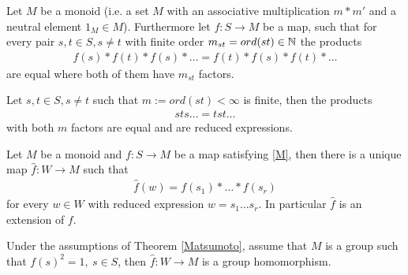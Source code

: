 \documentclass[]{article}
\begin{document}
Let \(M\) be a monoid (i.e. a set \(M\) with an associative multiplication \(m * m'\) and a neutral element \(1_M \in M\)). Furthermore
let \(f:S \rightarrow M\) be a map, such that for every pair \(s,t \in S, s \neq t\) with finite order \(m_{st}=ord(st) \in {\mathbb{N}}\) the products
\begin{align*}
    f(s)*f(t)*f(s)* \dots = f(t) * f(s) * f(t) *\dots \tag{M}
    \label{M}
\end{align*}
are equal where both of them have \(m_{st}\) factors. 
\setcounter{theorem}{7}

\begin{remark}
    Let \(s,t \in S, s \neq t\) such that \(m:=ord(st)< \infty\) is finite, then the products
    \begin{align*}
        sts \dots = tst \dots
    \end{align*}
    with both \(m\) factors are equal and are reduced expressions. 
    \label{remark:commutativity of products}
\end{remark}

\begin{theorem}[Matsumoto 1960's]
    Let \(M\) be a monoid and \(f:S \rightarrow M\) be a map satisfying \eqref{M}, then there is a unique map 
    \(\hat{f}:W \rightarrow M\) such that
    \begin{align*}
        \hat{f}(w)=f(s_1) * \dots * f(s_r)
    \end{align*}
    for every \(w \in W\) with reduced expression \(w=s_1 \dots s_r\). In particular \(\hat{f}\) is an extension of \(f\).
    \label{Matsumoto}
\end{theorem}

\begin{corollary}
    Under the assumptions of Theorem \ref{Matsumoto}, assume that \(M\) is a group such that \(f(s)^2=1, \ s \in S\), 
    then \(\hat{f}:W \rightarrow M\) is a group homomorphism. \label{corollary:Matsumoto}
\end{corollary}

\setcounter{section}{2}
\end{document}
